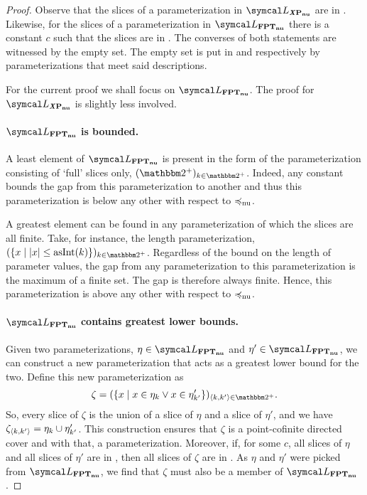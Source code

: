 \begin{proof}
  Observe that the slices of a parameterization in $\calL_\clXnu{P}$ are in .
  Likewise, for the slices of a parameterization in $\calL_\clnu{FPT}$ there is a constant $c$ such that the slices are in .
  The converses of both statements are witnessed by the empty set.
  The empty set is put in  and  respectively by parameterizations that meet said descriptions.

  For the current proof we shall focus on $\calL_\clnu{FPT}$.
  The proof for $\calL_\clXnu{P}$ is slightly less involved.

  \paragraph{$\calL_\clnu{FPT}$ is bounded.}
  A least element of $\calL_\clnu{FPT}$ is present in the form of the parameterization consisting of `full' slices only, $(\binary^+)_{k \in \binary^+}$.
  Indeed, any constant bounds the gap from this parameterization to another and thus this parameterization is below any other with respect to $\preccurlyeq_\mathrm{nu}$.

  A greatest element can be found in any parameterization of which the slices are all finite.
  Take, for instance, the length parameterization, $(\{x \st \length{x} \le \asNat(k)\})_{k \in \binary^+}$.
  Regardless of the bound on the length of parameter values, the gap from any parameterization to this parameterization is the maximum of a finite set.
  The gap is therefore always finite.
  Hence, this parameterization is above any other with respect to $\preccurlyeq_\mathrm{nu}$.

  \paragraph{$\calL_\clnu{FPT}$ contains greatest lower bounds.}
  Given two parameterizations, $\eta \in \calL_\clnu{FPT}$ and $\eta' \in \calL_\clnu{FPT}$, we can construct a new parameterization that acts as a greatest lower bound for the two.
  Define this new parameterization as
  \begin{equation*}
    \zeta \deq (\{x \st x \in \eta_k \lor x \in \eta'_{k'}\})_{\pair{k}{k'} \in \binary^+}.
  \end{equation*}
  So, every slice of $\zeta$ is the union of a slice of $\eta$ and a slice of $\eta'$, and we have $\zeta_{\langle k, k'\rangle} = \eta_k \cup \eta'_{k'}$.
  This construction ensures that $\zeta$ is a point-cofinite directed cover and with that, a parameterization.
  Moreover, if, for some $c$, all slices of $\eta$ and all slices of $\eta'$ are in , then all slices of $\zeta$ are in .
  As $\eta$ and $\eta'$ were picked from $\calL_\clnu{FPT}$, we find that $\zeta$ must also be a member of $\calL_\clnu{FPT}$.


\end{proof}
